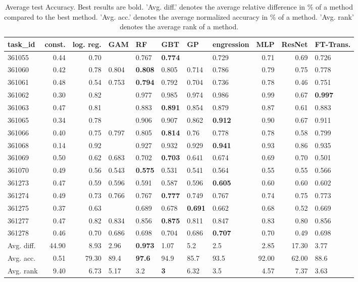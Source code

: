 \begin{table}[ht!]
\centering
\begingroup\footnotesize
\begin{tabular}{lrrlllllrrl}
  \hline
\hline
task\_id & const. & log. reg. & GAM & RF & GBT & GP & engression & MLP & ResNet & FT-Trans. \\ 
  \hline
361055 & 0.44 & 0.70 &  & 0.767 & \textbf{0.774} &  & 0.729 & 0.71 & 0.69 & 0.726 \\ 
  361060 & 0.42 & 0.78 & 0.804 & \textbf{0.808} & 0.805 & 0.714 & 0.786 & 0.79 & 0.75 & 0.778 \\ 
  361061 & 0.48 & 0.54 & 0.753 & \textbf{0.794} & 0.792 & 0.704 & 0.736 & 0.78 & 0.46 & 0.751 \\ 
  361062 & 0.30 & 0.82 &  & 0.977 & 0.985 & 0.974 & 0.986 & 0.99 & 0.67 & \textbf{0.997} \\ 
  361063 & 0.47 & 0.81 &  & 0.883 & \textbf{0.891} & 0.854 & 0.879 & 0.87 & 0.61 & 0.883 \\ 
  361065 & 0.34 & 0.78 &  & 0.906 & 0.907 & 0.862 & \textbf{0.912} & 0.90 & 0.67 & 0.911 \\ 
  361066 & 0.40 & 0.75 & 0.797 & 0.805 & \textbf{0.814} & 0.76 & 0.778 & 0.78 & 0.58 & 0.799 \\ 
  361068 & 0.14 & 0.92 &  & 0.927 & 0.932 & 0.929 & \textbf{0.941} & 0.93 & 0.86 & 0.935 \\ 
  361069 & 0.50 & 0.62 & 0.683 & 0.702 & \textbf{0.703} & 0.641 & 0.674 & 0.69 & 0.70 & 0.501 \\ 
  361070 & 0.49 & 0.56 & 0.543 & \textbf{0.575} & 0.531 & 0.541 & 0.564 & 0.55 & 0.55 & 0.566 \\ 
  361273 & 0.47 & 0.59 & 0.596 & 0.591 & 0.587 & 0.596 & \textbf{0.605} & 0.60 & 0.60 & 0.602 \\ 
  361274 & 0.49 & 0.73 & 0.766 & 0.767 & \textbf{0.777} & 0.749 & 0.767 & 0.74 & 0.75 & 0.773 \\ 
  361275 & 0.37 & 0.63 &  & 0.689 & 0.678 & \textbf{0.691} & 0.662 & 0.68 & 0.52 & 0.669 \\ 
  361277 & 0.47 & 0.82 & 0.834 & 0.856 & \textbf{0.875} & 0.811 & 0.847 & 0.83 & 0.80 & 0.856 \\ 
  361278 & 0.46 & 0.70 & 0.686 & 0.698 & 0.704 & 0.686 & \textbf{0.707} & 0.70 & 0.49 & 0.698 \\ 
   \hline
Avg. diff. & 44.90 & 8.93 & 2.96 & \textbf{0.973} & 1.07 & 5.2 & 2.5 & 2.85 & 17.30 & 3.77 \\ 
  Avg. acc. & 0.51 & 79.30 & 89.4 & \textbf{97.6} & 94.9 & 85.7 & 93.5 & 92.00 & 62.00 & 88.6 \\ 
  Avg. rank & 9.40 & 6.73 & 5.17 & 3.2 & \textbf{3} & 6.32 & 3.5 & 4.57 & 7.37 & 3.63 \\ 
   \hline
\hline
\end{tabular}
\endgroup
\caption{Average test Accuracy. 
                  Best results are bold. 
                  'Avg. diff.' denotes the average relative difference in \% of a method compared to the best method.
                  'Avg. acc.' denotes the average normalized accuracy in \% of a method.
                  'Avg. rank' denotes the average rank of a method.} 
\label{TABLES/table_results_Accuracy_umap}
\end{table}
